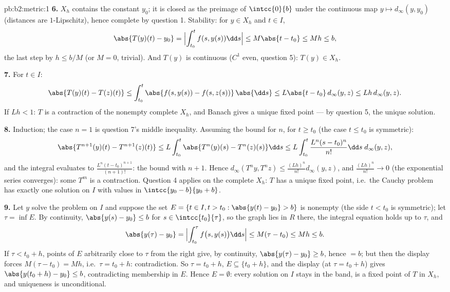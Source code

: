 \begin{solution}{pb:b2:metric:1}
\textbf{6.} $X_h$ contains the constant $y_0$; it is closed as
the preimage of $\intcc{0}{b}$ under the continuous map $y
\mapsto d_\infty(y, y_0)$ (distances are $1$-Lipschitz), hence
complete by question 1. Stability: for $y \in X_h$ and $t \in
I$,
\[
\abs{T(y)(t) - y_0} = \Bigl|\int_{t_0}^{t}f(s, y(s))\dd s\Bigr|
\leq M\abs{t - t_0} \leq Mh \leq b ,
\]
the last step by $h \leq b/M$ (or $M = 0$, trivial). And $T(y)$
is continuous ($C^1$ even, question 5): $T(y) \in X_h$.

\textbf{7.} For $t \in I$:
\[
\abs{T(y)(t) - T(z)(t)} \leq \int_{t_0}^{t}\abs{f(s, y(s)) -
f(s, z(s))}\,\abs{\dd s} \leq L\abs{t - t_0}\,d_\infty(y,z)
\leq Lh\,d_\infty(y,z).
\]
If $Lh < 1$: $T$ is a contraction of the nonempty complete
$X_h$, and Banach gives a unique fixed point --- by question 5,
the unique solution.

\textbf{8.} Induction; the case $n = 1$ is question 7's middle
inequality. Assuming the bound for $n$, for $t \geq t_0$ (the
case $t \leq t_0$ is symmetric):
\[
\abs{T^{n+1}(y)(t) - T^{n+1}(z)(t)}
\leq L\int_{t_0}^{t}\abs{T^n(y)(s) - T^n(z)(s)}\dd s
\leq L\int_{t_0}^{t}\frac{L^n(s - t_0)^n}{n!}\dd s\;
d_\infty(y,z),
\]
and the integral evaluates to $\frac{L^n(t -
t_0)^{n+1}}{(n+1)!}$: the bound with $n + 1$. Hence
$d_\infty(T^n y, T^n z) \leq \frac{(Lh)^n}{n!}d_\infty(y, z)$,
and $\frac{(Lh)^n}{n!} \to 0$ (the exponential series
converges): some $T^m$ is a contraction. Question 4 applies on
the complete $X_h$: $T$ has a unique fixed point, i.e.\ the
Cauchy problem has exactly one solution on $I$ with values in
$\intcc{y_0 - b}{y_0 + b}$.

\textbf{9.} Let $y$ solve the problem on $I$ and suppose the set
$E = \{t \in I, t > t_0 : \abs{y(t) - y_0} > b\}$ is nonempty
(the side $t < t_0$ is symmetric); let $\tau = \inf E$. By
continuity, $\abs{y(s) - y_0} \leq b$ for $s \in
\intcc{t_0}{\tau}$, so the graph lies in $R$ there, the integral
equation holds up to $\tau$, and
\[
\abs{y(\tau) - y_0} = \Bigl|\int_{t_0}^{\tau}f\bigl(s,
y(s)\bigr)\dd s\Bigr| \leq M(\tau - t_0) \leq Mh \leq b .
\]
If $\tau < t_0 + h$, points of $E$ arbitrarily close to $\tau$
from the right give, by continuity, $\abs{y(\tau) - y_0} \geq
b$, hence $= b$; but then the display forces $M(\tau - t_0) =
Mh$, i.e.\ $\tau = t_0 + h$: contradiction. So $\tau = t_0 + h$,
$E \subseteq \{t_0 + h\}$, and the display (at $\tau = t_0 + h$)
gives $\abs{y(t_0 + h) - y_0} \leq b$, contradicting membership
in $E$. Hence $E = \emptyset$: every solution on $I$ stays in
the band, is a fixed point of $T$ in $X_h$, and uniqueness is
unconditional.


\end{solution}
